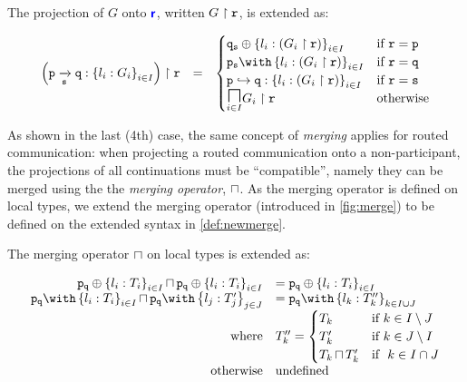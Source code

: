 \begin{definition}[Projection]
The projection of $G$ onto ${\color{blue}\bm{\mathsf{r}}}$,
written ${G} \upharpoonright {\mathtt{r}}$, is extended as:

\doublespacing
\[
\begin{array}{>{\displaystyle}rc>{\displaystyle}l}

\proj{
\left(\groute{p}{q}{s}{l_i: G_i}{i \in I}\right)
}{r} & = & 
\begin{cases}
\tselproxy{q}{s}{l_i: (\proj{G_i}{r})}{i \in I}
	& \text{if} ~ \mrole{r} = \mrole{p} \\
\tbraproxy{p}{s}{l_i: (\proj{G_i}{r})}{i \in I}
	& \text{if} ~ \mrole{r} = \mrole{q} \\
\router{p}{q}{l_i: (\proj{G_i}{r})}{i \in I}
	& \text{if} ~ \mrole{r} = \mrole{s} \\
\underset{i \in I}{\MERGEOP}\proj{G_i}{r}
	& \text{otherwise} \\
\end{cases}
\\

\end{array}
\]
\singlespacing

\label{def:newprojection}
\end{definition}

As shown in the last (4th) case, 
the same concept of \textit{merging}
applies for routed communication:
when projecting a routed communication
onto a non-participant, the projections of
all continuations must be ``compatible'',
namely they can be merged using the
the \textit{merging operator}, $\sqcap$.
As the merging operator is defined on local
types, we extend the merging operator 
(introduced in \cref{fig:merge}) to be defined
on the extended syntax in \cref{def:newmerge}.

\begin{definition}
The merging operator $\sqcap$ on local types
is extended as:

\doublespacing
\[
\begin{array}{rl}
\tmerge
{\tselproxy{p}{q}{l_i: T_i}{i \in I}}
{\tselproxy{p}{q}{l_i: T_i}{i \in I}}
	& = \tselproxy{p}{q}{l_i: T_i}{i \in I} \\
	
\tmerge
{\tbraproxy{p}{q}{l_i: T_i}{i \in I}}
{\tbraproxy{p}{q}{l_j: T'_j}{j \in J}}
	& = \tbraproxy{p}{q}{l_k: T''_k}{k \in I \cup J} \\
\text{where} & T''_k = \begin{cases}
T_k & \text{if} ~ k \in I \setminus J \\
T'_k & \text{if} ~ k \in J \setminus I \\
\tmerge{T_k}{T'_k} & \text{if } ~ k \in I \cap J \\
\end{cases} \\
\text{otherwise} & \text{undefined}
\end{array}
\]
\singlespacing

\label{def:newmerge}
\end{definition}

